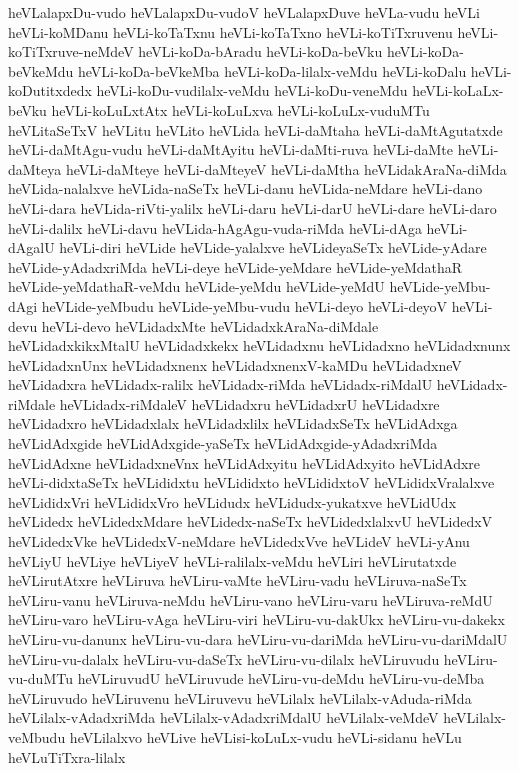 {heVLalapxDu-vudo
heVLalapxDu-vudoV
heVLalapxDuve
heVLa-vudu
heVLi
heVLi-koMDanu
heVLi-koTaTxnu
heVLi-koTaTxno
heVLi-koTiTxruvenu
heVLi-koTiTxruve-neMdeV
heVLi-koDa-bAradu
heVLi-koDa-beVku
heVLi-koDa-beVkeMdu
heVLi-koDa-beVkeMba
heVLi-koDa-lilalx-veMdu
heVLi-koDalu
heVLi-koDutitxdedx
heVLi-koDu-vudilalx-veMdu
heVLi-koDu-veneMdu
heVLi-koLaLx-beVku
heVLi-koLuLxtAtx
heVLi-koLuLxva
heVLi-koLuLx-vuduMTu
heVLitaSeTxV
heVLitu
heVLito
heVLida
heVLi-daMtaha
heVLi-daMtAgutatxde
heVLi-daMtAgu-vudu
heVLi-daMtAyitu
heVLi-daMti-ruva
heVLi-daMte
heVLi-daMteya
heVLi-daMteye
heVLi-daMteyeV
heVLi-daMtha
heVLidakAraNa-diMda
heVLida-nalalxve
heVLida-naSeTx
heVLi-danu
heVLida-neMdare
heVLi-dano
heVLi-dara
heVLida-riVti-yalilx
heVLi-daru
heVLi-darU
heVLi-dare
heVLi-daro
heVLi-dalilx
heVLi-davu
heVLida-hAgAgu-vuda-riMda
heVLi-dAga
heVLi-dAgalU
heVLi-diri
heVLide
heVLide-yalalxve
heVLideyaSeTx
heVLide-yAdare
heVLide-yAdadxriMda
heVLi-deye
heVLide-yeMdare
heVLide-yeMdathaR
heVLide-yeMdathaR-veMdu
heVLide-yeMdu
heVLide-yeMdU
heVLide-yeMbu-dAgi
heVLide-yeMbudu
heVLide-yeMbu-vudu
heVLi-deyo
heVLi-deyoV
heVLi-devu
heVLi-devo
heVLidadxMte
heVLidadxkAraNa-diMdale
heVLidadxkikxMtalU
heVLidadxkekx
heVLidadxnu
heVLidadxno
heVLidadxnunx
heVLidadxnUnx
heVLidadxnenx
heVLidadxnenxV-kaMDu
heVLidadxneV
heVLidadxra
heVLidadx-ralilx
heVLidadx-riMda
heVLidadx-riMdalU
heVLidadx-riMdale
heVLidadx-riMdaleV
heVLidadxru
heVLidadxrU
heVLidadxre
heVLidadxro
heVLidadxlalx
heVLidadxlilx
heVLidadxSeTx
heVLidAdxga
heVLidAdxgide
heVLidAdxgide-yaSeTx
heVLidAdxgide-yAdadxriMda
heVLidAdxne
heVLidadxneVnx
heVLidAdxyitu
heVLidAdxyito
heVLidAdxre
heVLi-didxtaSeTx
heVLididxtu
heVLididxto
heVLididxtoV
heVLididxVralalxve
heVLididxVri
heVLididxVro
heVLidudx
heVLidudx-yukatxve
heVLidUdx
heVLidedx
heVLidedxMdare
heVLidedx-naSeTx
heVLidedxlalxvU
heVLidedxV
heVLidedxVke
heVLidedxV-neMdare
heVLidedxVve
heVLideV
heVLi-yAnu
heVLiyU
heVLiye
heVLiyeV
heVLi-ralilalx-veMdu
heVLiri
heVLirutatxde
heVLirutAtxre
heVLiruva
heVLiru-vaMte
heVLiru-vadu
heVLiruva-naSeTx
heVLiru-vanu
heVLiruva-neMdu
heVLiru-vano
heVLiru-varu
heVLiruva-reMdU
heVLiru-varo
heVLiru-vAga
heVLiru-viri
heVLiru-vu-dakUkx
heVLiru-vu-dakekx
heVLiru-vu-danunx
heVLiru-vu-dara
heVLiru-vu-dariMda
heVLiru-vu-dariMdalU
heVLiru-vu-dalalx
heVLiru-vu-daSeTx
heVLiru-vu-dilalx
heVLiruvudu
heVLiru-vu-duMTu
heVLiruvudU
heVLiruvude
heVLiru-vu-deMdu
heVLiru-vu-deMba
heVLiruvudo
heVLiruvenu
heVLiruvevu
heVLilalx
heVLilalx-vAduda-riMda
heVLilalx-vAdadxriMda
heVLilalx-vAdadxriMdalU
heVLilalx-veMdeV
heVLilalx-veMbudu
heVLilalxvo
heVLive
heVLisi-koLuLx-vudu
heVLi-sidanu
heVLu
heVLuTiTxra-lilalx
}

